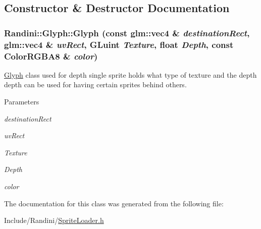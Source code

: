 \subsection{Constructor \& Destructor Documentation}
\hypertarget{classRandini_1_1Glyph_a14fd7b79d6d01c71bdd82332b1f34371}{
\subsubsection[{Glyph}]{\setlength{\rightskip}{0pt plus 5cm}Randini::Glyph::Glyph (const glm::vec4 \& {\em destinationRect}, \/  glm::vec4 \& {\em uvRect}, \/  GLuint {\em Texture}, \/  float {\em Depth}, \/  const {\bf ColorRGBA8} \& {\em color})}}
\label{classRandini_1_1Glyph_a14fd7b79d6d01c71bdd82332b1f34371}


\hyperlink{classRandini_1_1Glyph}{Glyph} class used for depth single sprite holds what type of texture and the depth depth can be used for having certain sprites behind others. 
\begin{DoxyParams}{Parameters}
\item[{\em destinationRect}]\item[{\em uvRect}]\item[{\em Texture}]\item[{\em Depth}]\item[{\em color}]\end{DoxyParams}


The documentation for this class was generated from the following file:\begin{DoxyCompactItemize}
\item 
Include/Randini/\hyperlink{SpriteLoader_8h}{SpriteLoader.h}\end{DoxyCompactItemize}
